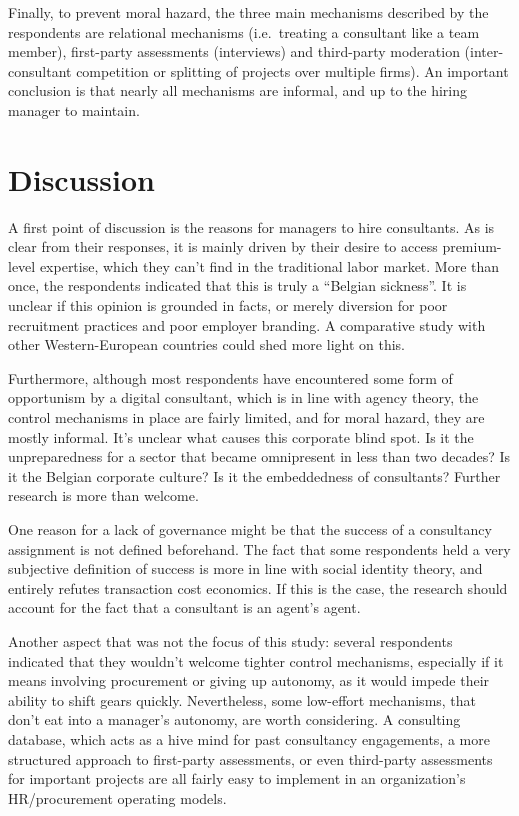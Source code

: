 \documentclass[
  man,floatsintext]{apa6}
\begin{document}
Finally, to prevent moral hazard, the three main mechanisms described by the respondents are relational mechanisms (i.e.~treating a consultant like a team member), first-party assessments (interviews) and third-party moderation (inter-consultant competition or splitting of projects over multiple firms). An important conclusion is that nearly all mechanisms are informal, and up to the hiring manager to maintain.

\section{Discussion}\label{discussion}

A first point of discussion is the reasons for managers to hire consultants. As is clear from their responses, it is mainly driven by their desire to access premium-level expertise, which they can't find in the traditional labor market. More than once, the respondents indicated that this is truly a ``Belgian sickness''. It is unclear if this opinion is grounded in facts, or merely diversion for poor recruitment practices and poor employer branding. A comparative study with other Western-European countries could shed more light on this.

Furthermore, although most respondents have encountered some form of opportunism by a digital consultant, which is in line with agency theory, the control mechanisms in place are fairly limited, and for moral hazard, they are mostly informal. It's unclear what causes this corporate blind spot. Is it the unpreparedness for a sector that became omnipresent in less than two decades? Is it the Belgian corporate culture? Is it the embeddedness of consultants? Further research is more than welcome.

One reason for a lack of governance might be that the success of a consultancy assignment is not defined beforehand. The fact that some respondents held a very subjective definition of success is more in line with social identity theory, and entirely refutes transaction cost economics. If this is the case, the research should account for the fact that a consultant is an agent's agent.

Another aspect that was not the focus of this study: several respondents indicated that they wouldn't welcome tighter control mechanisms, especially if it means involving procurement or giving up autonomy, as it would impede their ability to shift gears quickly. Nevertheless, some low-effort mechanisms, that don't eat into a manager's autonomy, are worth considering. A consulting database, which acts as a hive mind for past consultancy engagements, a more structured approach to first-party assessments, or even third-party assessments for important projects are all fairly easy to implement in an organization's HR/procurement operating models.
\end{document}
